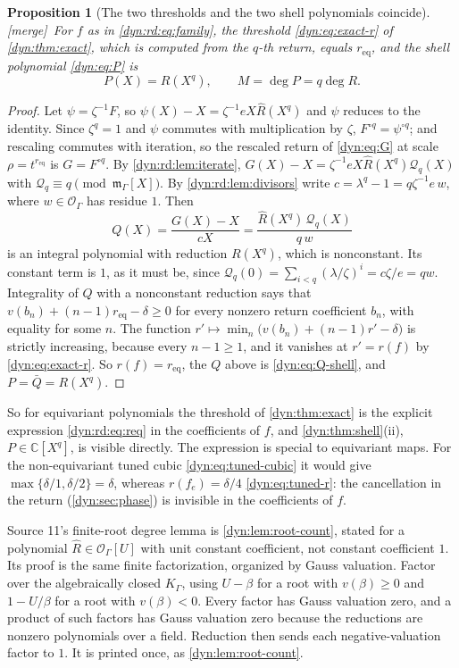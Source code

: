 \documentclass[11pt,letterpaper]{article}
\newtheorem{proposition}[proposition]{Proposition}
\theoremstyle{definition}
\theoremstyle{remark}
\newcommand{\C}{\mathbb C}
\newcommand{\OO}{\mathcal O}
\newcommand{\m}{\mathfrak m}
\newcommand{\mergetag}{\textup{\textsf{\small[merge]}}}%
\numberwithin{equation}{section}
\begin{document}
\begin{proposition}[The two thresholds and the two shell polynomials
coincide]\label{dyn:rd:prop:return}
\mergetag\ For $f$ as in \eqref{dyn:rd:eq:family}, the threshold
\eqref{dyn:eq:exact-r} of \cref{dyn:thm:exact}, which is computed from the
$q$-th return, equals $r_{\mathrm{eq}}$, and the shell polynomial
\eqref{dyn:eq:P} is
\begin{equation}\label{dyn:rd:eq:PR}
 P(X)=R(X^{q}),\qquad M=\deg P=q\deg R .
\end{equation}
\end{proposition}
\begin{proof}
Let $\psi=\zeta^{-1}F$, so $\psi(X)-X=\zeta^{-1}eX\widehat R(X^{q})$ and
$\psi$ reduces to the identity. Since $\zeta^{q}=1$ and $\psi$ commutes with
multiplication by $\zeta$, $F^{\circ q}=\psi^{\circ q}$; and rescaling
commutes with iteration, so the rescaled return of \eqref{dyn:eq:G} at
scale $\rho=t^{r_{\mathrm{eq}}}$ is $G=F^{\circ q}$. By
\cref{dyn:rd:lem:iterate},
$G(X)-X=\zeta^{-1}eX\widehat R(X^{q})\mathcal Q_q(X)$ with
$\mathcal Q_q\equiv q\pmod{\m_\Gamma[X]}$. By \cref{dyn:rd:lem:divisors}
write $c=\lambda^{q}-1=q\zeta^{-1}e\,w$, where $w\in\OO_\Gamma$ has residue
$1$. Then
\[
 Q(X)=\frac{G(X)-X}{cX}=\frac{\widehat R(X^{q})\,\mathcal Q_q(X)}{q\,w}
\]
is an integral polynomial with reduction $R(X^{q})$, which is nonconstant.
Its constant term is $1$, as it must be, since
$\mathcal Q_q(0)=\sum_{i<q}(\lambda/\zeta)^{i}=c\zeta/e=qw$. Integrality of
$Q$ with a nonconstant reduction says that
$v(b_n)+(n-1)r_{\mathrm{eq}}-\delta\ge0$ for every nonzero return
coefficient $b_n$, with equality for some $n$. The function
$r'\mapsto\min_n\bigl(v(b_n)+(n-1)r'-\delta\bigr)$ is strictly increasing,
because every $n-1\ge1$, and it vanishes at $r'=r(f)$ by
\eqref{dyn:eq:exact-r}. So $r(f)=r_{\mathrm{eq}}$, the $Q$ above is
\eqref{dyn:eq:Q-shell}, and $P=\bar Q=R(X^{q})$.
\end{proof}

So for equivariant polynomials the threshold of \cref{dyn:thm:exact} is the
explicit expression \eqref{dyn:rd:eq:req} in the coefficients of $f$, and
\cref{dyn:thm:shell}(ii), $P\in\C[X^{q}]$, is visible directly. The
expression is special to equivariant maps. For the non-equivariant tuned
cubic \eqref{dyn:eq:tuned-cubic} it would give
$\max\{\delta/1,\delta/2\}=\delta$, whereas $r(f_e)=\delta/4$
\eqref{dyn:eq:tuned-r}: the cancellation in the return
(\cref{dyn:sec:phase}) is invisible in the coefficients of $f$.

Source 11's finite-root degree lemma is \cref{dyn:lem:root-count}, stated for
a polynomial $\widehat R\in\OO_\Gamma[U]$ with unit constant coefficient,
not constant coefficient $1$. Its proof is the same finite factorization,
organized by Gauss valuation. Factor over the algebraically closed
$K_\Gamma$, using $U-\beta$ for a root with $v(\beta)\ge0$ and $1-U/\beta$
for a root with $v(\beta)<0$. Every factor has Gauss valuation zero, and a
product of such factors has Gauss valuation zero because the reductions are
nonzero polynomials over a field. Reduction then sends each
negative-valuation factor to $1$. It is printed once, as
\cref{dyn:lem:root-count}.
\end{document}

